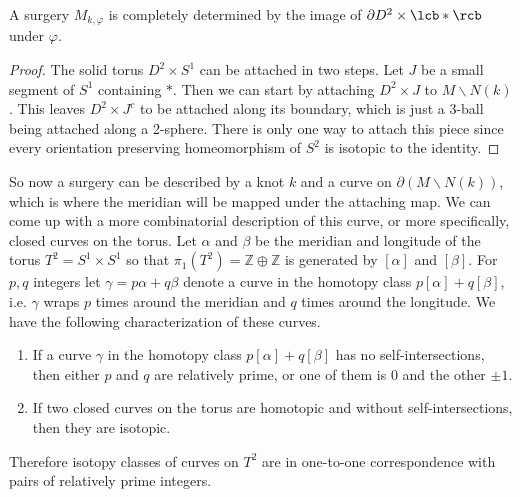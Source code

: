 \begin{prop}
A surgery $M_{k,\varphi}$ is completely determined by the image of $\partial D^2 \times \lcb * \rcb$ under $\varphi$.
\end{prop}
\begin{proof}
The solid torus $D^2 \times S^1$ can be attached in two steps. Let $J$ be a small segment of $S^1$ containing $*$. Then we can start by attaching $D^2 \times J$ to $M \backslash N(k)$. This leaves $D^2 \times J^c$ to be attached along its boundary, which is just a 3-ball being attached along a 2-sphere. There is only one way to attach this piece since every orientation preserving homeomorphism of $S^2$ is isotopic to the identity.
\end{proof}

So now a surgery can be described by a knot $k$ and a curve on $\partial(M \backslash N(k))$, which is where the meridian will be mapped under the attaching map. We can come up with a more combinatorial description of this curve, or more specifically, closed curves on the torus. Let $\alpha$ and $\beta$ be the meridian and longitude of the torus $T^2 = S^1 \times S^1$ so that $\pi_1(T^2) = \mathbb Z \oplus \mathbb Z$ is generated by $[\alpha]$ and $[\beta]$. For $p,q$ integers let $\gamma = p\alpha + q\beta$ denote a curve in the homotopy class $p[\alpha] + q[\beta]$, i.e. $\gamma$ wraps $p$ times around the meridian and $q$ times around the longitude. We have the following characterization of these curves.

\begin{prop}
\sloppyspace
\begin{enumerate}
	\item If a curve $\gamma$ in the homotopy class $p[\alpha] + q[\beta]$ has no self-intersections, then either $p$ and $q$ are relatively prime, or one of them is 0 and the other $\pm 1$. 
	\item If two closed curves on the torus are homotopic and without self-intersections, then they are isotopic.
\end{enumerate}
\end{prop}

Therefore isotopy classes of curves on $T^2$ are in one-to-one correspondence with pairs of relatively prime integers.

